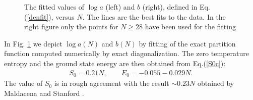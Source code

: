 \documentclass[aps,showpacs,floatfix,superscriptaddress,pre,11pt]{revtex4-1}
\newcommand{\be}{\begin{eqnarray}}
\newcommand{\ee}{\end{eqnarray}}
\begin{document}
\begin{figure}%
	\centering
	\caption{The fitted values of $\log a$ (left) and $b$ (right), defined in Eq.(\ref{denfit}), versus $N$.
		The lines are the best fits to the data. In the right figure only
		the points for $N\ge 28$ have been used for the fitting}
	\label{fig:ab}
\end{figure}




In Fig. \ref{fig:ab} we depict  $\log a(N)$ and $b(N)$  by fitting of the exact partition function computed numerically by exact diagonalization.
The zero temperature entropy and the ground state energy are then obtained from Eq.(\ref{S0c}):
\be
S_0 = 0.21 N,  \qquad E_0 = -0.055 -0.029 N.
\ee
The value of $S_0$ is in rough agreement with the result $\sim 0.23 N$ obtained by 
Maldacena and Stanford \cite{maldacena2016}. 
\end{document}
